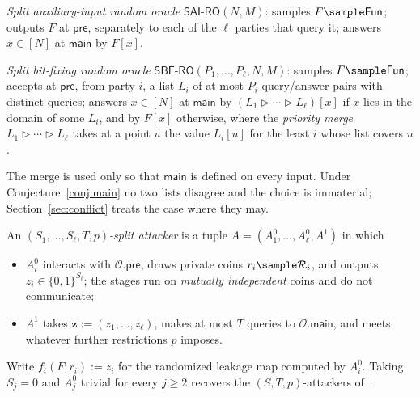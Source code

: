 \documentclass{conjura-conjecture}
\newcommand{\Fun}{\mathsf{Fun}}
\newcommand{\bits}{\{0,1\}}
\newcommand{\vz}{\mathbf{z}}
\newcommand{\SAI}{\mathsf{SAI\text{-}RO}}
\newcommand{\SBF}{\mathsf{SBF\text{-}RO}}
\newcommand{\pre}{\mathsf{pre}}
\newcommand{\main}{\mathsf{main}}
\newcommand{\merge}{\mathbin{\triangleright}}
\begin{document}
\begin{definition}\label{def:oracles}
\emph{Split auxiliary-input random oracle} $\SAI(N,M)$: samples
$F \sample \Fun$; outputs $F$ at $\pre$, separately to each of the $\ell$
parties that query it; answers $x \in [N]$ at $\main$ by $F[x]$.

\emph{Split bit-fixing random oracle} $\SBF(P_1,\dots,P_\ell,N,M)$:
samples $F \sample \Fun$; accepts at $\pre$, from party $i$, a list $L_i$
of at most $P_i$ query/answer pairs with distinct queries; answers
$x \in [N]$ at $\main$ by $(L_1 \merge \cdots \merge L_\ell)[x]$ if $x$
lies in the domain of some $L_i$, and by $F[x]$ otherwise, where the
\emph{priority merge} $L_1 \merge \cdots \merge L_\ell$ takes at a point
$u$ the value $L_i[u]$ for the least $i$ whose list covers $u$.

The merge is used only so that $\main$ is defined on every input. Under
Conjecture~\ref{conj:main} no two lists disagree and the choice is
immaterial; Section~\ref{sec:conflict} treats the case where they may.
\end{definition}

\begin{definition}\label{def:attackers}
An \emph{$(S_1,\dots,S_\ell,T,p)$-split attacker} is a tuple
$A = (A^{0}_1,\dots,A^{0}_\ell,A^{1})$ in which
\begin{itemize}
\item $A^{0}_i$ interacts with $\mathcal{O}.\pre$, draws private coins
  $r_i \sample \mathcal{R}_i$, and outputs $z_i \in \bits^{S_i}$; the
  stages run on \emph{mutually independent} coins and do not communicate;
\item $A^{1}$ takes $\vz := (z_1,\dots,z_\ell)$, makes at most $T$ queries
  to $\mathcal{O}.\main$, and meets whatever further restrictions $p$
  imposes.
\end{itemize}
Write $f_i(F;r_i) := z_i$ for the randomized leakage map computed by
$A^{0}_i$. Taking $S_j = 0$ and $A^{0}_j$ trivial for every $j \ge 2$
recovers the $(S,T,p)$-attackers of~\cite[Def.~2]{CDGS}.
\end{definition}
\end{document}

